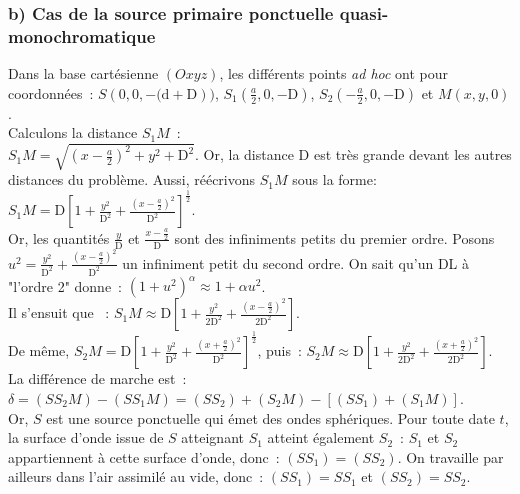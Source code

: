 \documentclass{article}
\begin{document}
\subsubsection*{b) Cas de la source primaire ponctuelle quasi-monochromatique}
Dans la base cartésienne $(Oxyz)$, les différents points \textit{ad
hoc} ont pour coordonnées : $S\left(0,0,-(\mathrm{d}+\mathrm{D}\right))$,
$S_{1}\left(\frac{a}{2},0,-\mathrm{D}\right)$, $S_{2}\left(-\frac{a}{2},0,-\mathrm{D}\right)$ et $M\left(x,y,0\right)$.
\\
Calculons la distance $S_{1}M$ : \\
$S_{1}M = \sqrt{\left(x-\frac{a}{2}\right)^{2}+y^{2}+\mathrm{D}^{2}}$. Or, la distance
$\mathrm{D}$ est très grande devant les autres distances du problème. Aussi,
réécrivons $S_{1}M$ sous la forme: \\
$S_{1}M =
\mathrm{D}\left[1+\frac{y^{2}}{\mathrm{D}^{2}}+\frac{\left(x-\frac{a}{2}\right)^{2}}{\mathrm{D}^{2}}\right]^{\frac{1}{2}}$.
\\
Or, les quantités $\frac{y}{\mathrm{D}}$ et $\frac{x-\frac{a}{2}}{\mathrm{D}}$ sont
des infiniments petits du premier ordre. Posons $u^{2} =
\frac{y^{2}}{\mathrm{D}^{2}}+\frac{\left(x-\frac{a}{2}\right)^{2}}{\mathrm{D}^{2}}$ un infiniment
petit du second ordre. On sait qu'un DL à "l'ordre 2" donne :
$\left(1+u^{2}\right)^{\alpha} \approx 1+\alpha u^{2}$. \\
Il s'ensuit que  : $S_{1}M \approx
\mathrm{D}\left[1+\frac{y^{2}}{2\mathrm{D}^{2}}+\frac{\left(x-\frac{a}{2}\right)^{2}}{2\mathrm{D}^{2}}\right]$.
\\
De même, $S_{2}M =
\mathrm{D}\left[1+\frac{y^{2}}{\mathrm{D}^{2}}+\frac{\left(x+\frac{a}{2}\right)^{2}}{\mathrm{D}^{2}}\right]^{\frac{1}{2}}$,
puis : $S_{2}M \approx
\mathrm{D}\left[1+\frac{y^{2}}{2\mathrm{D}^{2}}+\frac{\left(x+\frac{a}{2}\right)^{2}}{2\mathrm{D}^{2}}\right]$. \\
La différence de marche est : $\delta = \left(SS_{2}M\right) - \left(SS_{1}M\right) = \left(SS_{2}\right) + \left(S_{2}M\right)-\left[\left(SS_{1}\right)+\left(S_{1}M\right)\right]$.  \\
Or, $S$ est une source ponctuelle qui émet des ondes sphériques.
Pour toute date $t$, la surface d'onde issue de $S$ atteignant
$S_{1}$ atteint également $S_{2}$ : $S_{1}$ et $S_{2}$ appartiennent
à cette surface d'onde, donc : $\left(SS_{1}\right) = \left(SS_{2}\right)$. On travaille
par ailleurs dans l'air assimilé au vide, donc : $\left(SS_{1}\right) = SS_{1}$
et $\left(SS_{2}\right) = SS_{2}$. \\
\end{document}
